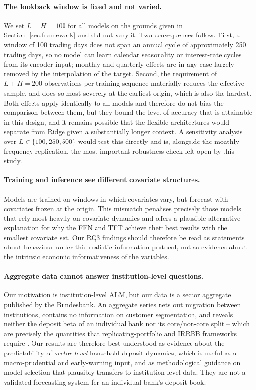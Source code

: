 \documentclass[11pt,a4paper]{article}
\begin{document}
\paragraph{The lookback window is fixed and not varied.}
We set $L=H=100$ for all models on the grounds given in
Section~\ref{sec:framework} and did not vary it. Two consequences follow.
First, a window of 100 trading days does not span an annual cycle of
approximately 250 trading days, so no model can learn calendar seasonality or
interest-rate cycles from its encoder input; monthly and quarterly effects are
in any case largely removed by the interpolation of the target. Second, the
requirement of $L+H=200$ observations per training sequence materially reduces
the effective sample, and does so most severely at the earliest origin, which
is also the hardest. Both effects apply identically to all models and
therefore do not bias the comparison between them, but they bound the level of
accuracy that is attainable in this design, and it remains possible that the
flexible architectures would separate from Ridge given a substantially longer
context. A sensitivity analysis over $L \in \{100, 250, 500\}$ would test this
directly and is, alongside the monthly-frequency replication, the most
important robustness check left open by this study.

\paragraph{Training and inference see different covariate structures.}
Models are trained on windows in which covariates vary, but forecast with
covariates frozen at the origin. This mismatch penalises precisely those
models that rely most heavily on covariate dynamics and offers a plausible
alternative explanation for why the FFN and TFT achieve their best results
with the smallest covariate set. Our RQ3 findings should therefore be read as
statements about behaviour under this realistic-information protocol, not as
evidence about the intrinsic economic informativeness of the variables.

\paragraph{Aggregate data cannot answer institution-level questions.}
Our motivation is institution-level ALM, but our data is a sector aggregate
published by the Bundesbank. An aggregate series nets out migration between
institutions, contains no information on customer segmentation, and reveals
neither the deposit beta of an individual bank nor its core/non-core split --
which are precisely the quantities that replicating-portfolio and IRRBB
frameworks require \citep{bcbs2016irrbb, eba2022irrbb, frauendorfer2003}.
Our results are therefore best understood as evidence about the predictability
of \emph{sector-level} household deposit dynamics, which is useful as a
macro-prudential and early-warning input, and as methodological guidance on
model selection that plausibly transfers to institution-level data. They are
not a validated forecasting system for an individual bank's deposit book.
\end{document}
